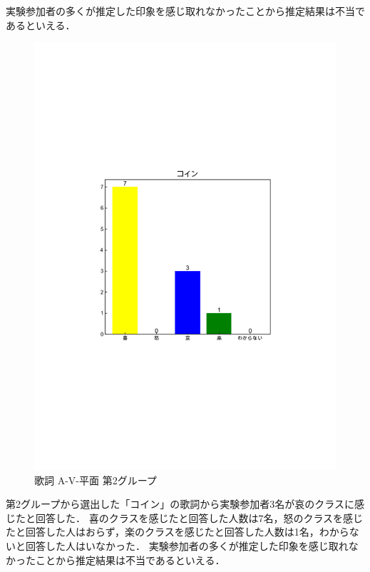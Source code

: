 実験参加者の多くが推定した印象を感じ取れなかったことから推定結果は不当であるといえる．
\newpage
\begin{figure}[H]
    \centering
    \includegraphics[width=14cm]{4320.pdf}
    \vspace{-1mm}
    \caption{歌詞 A-V-平面 第2グループ}
    \label{fig:mms}
    \vspace{5mm}
\end{figure}
第2グループから選出した「コイン」の歌詞から実験参加者3名が哀のクラスに感じたと回答した．
喜のクラスを感じたと回答した人数は7名，怒のクラスを感じたと回答した人はおらず，楽のクラスを感じたと回答した人数は1名，わからないと回答した人はいなかった．
実験参加者の多くが推定した印象を感じ取れなかったことから推定結果は不当であるといえる．
\newpage
